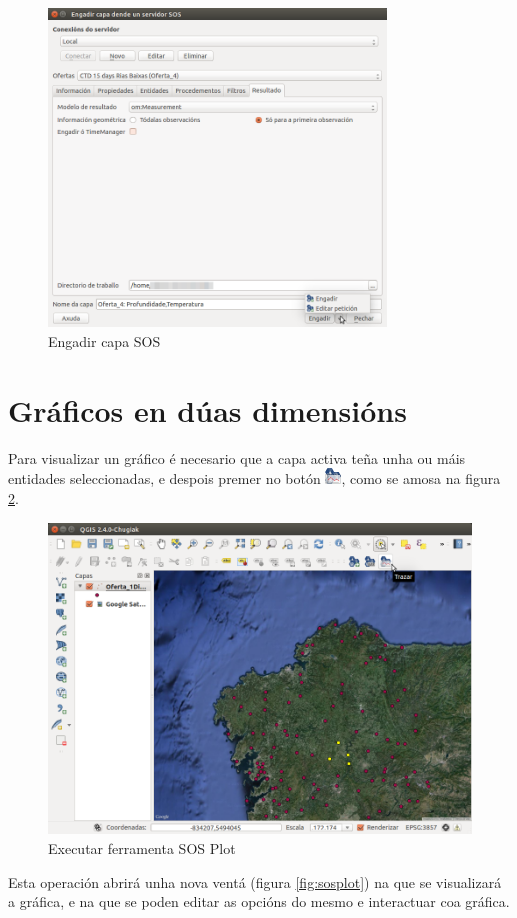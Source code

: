 \begin{figure}[hbtp]
\centering
\includegraphics[width=0.8\textwidth]{images/manual/editar_peticion.png}
\caption{Engadir capa SOS}
\label{fig:editarPeticion}
\end{figure}

\section{Gráficos en dúas dimensións}

Para visualizar un gráfico é necesario que a capa activa teña unha ou máis entidades seleccionadas, e despois premer no botón \includegraphics[width=16px]{images/manual/icon_plot.png}, como se amosa na figura \ref{fig:ejecutarSOSPlot}.

\begin{figure}[hbtp]
\centering
\includegraphics[width=\textwidth]{images/manual/ejecutar_sosplot.png}
\caption{Executar ferramenta SOS Plot}
\label{fig:ejecutarSOSPlot}
\end{figure}
\newpage
Esta operación abrirá unha nova ventá (figura \ref{fig:sosplot}) na que se visualizará a gráfica, e na que se poden editar as opcións do mesmo e interactuar coa gráfica.

